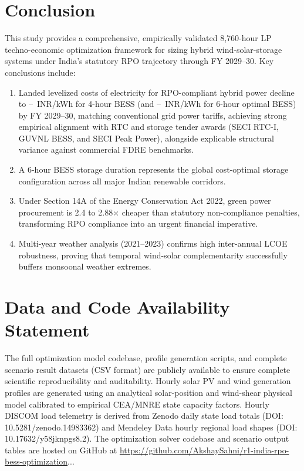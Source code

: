 \documentclass[11pt,a4paper]{article}
\begin{document}
\section{Conclusion}
\label{sec:conclusion_sec}

This study provides a comprehensive, empirically validated 8,760-hour LP techno-economic optimization framework for sizing hybrid wind-solar-storage systems under India's statutory RPO trajectory through FY 2029--30. Key conclusions include:
\begin{enumerate}
    \item Landed levelized costs of electricity for RPO-compliant hybrid power decline to \ValLcoeThirtyMin--\ValLcoeThirtyMax~INR/kWh for 4-hour BESS (and \ValLcoeSixHourThirtyMin--\ValLcoeSixHourThirtyMax~INR/kWh for 6-hour optimal BESS) by FY 2029--30, matching conventional grid power tariffs, achieving strong empirical alignment with RTC and storage tender awards (SECI RTC-I, GUVNL BESS, and SECI Peak Power), alongside explicable structural variance against commercial FDRE benchmarks.
    \item A 6-hour BESS storage duration represents the global cost-optimal storage configuration across all major Indian renewable corridors.
    \item Under Section 14A of the Energy Conservation Act 2022, green power procurement is 2.4 to 2.88$\times$ cheaper than statutory non-compliance penalties, transforming RPO compliance into an urgent financial imperative.
    \item Multi-year weather analysis (2021--2023) confirms high inter-annual LCOE robustness, proving that temporal wind-solar complementarity successfully buffers monsoonal weather extremes.
\end{enumerate}

\section*{Data and Code Availability Statement}
The full optimization model codebase, profile generation scripts, and complete scenario result datasets (CSV format) are publicly available to ensure complete scientific reproducibility and auditability. Hourly solar PV and wind generation profiles are generated using an analytical solar-position and wind-shear physical model calibrated to empirical CEA/MNRE state capacity factors. Hourly DISCOM load telemetry is derived from Zenodo daily state load totals (\textsf{DOI: 10.5281/zenodo.14983362}) and Mendeley Data hourly regional load shapes (\textsf{DOI: 10.17632/y58jknpgs8.2}). The optimization solver codebase and scenario output tables are hosted on GitHub at \url{https://github.com/AkshaySahni/r1-india-rpo-bess-optimization}...
\end{document}

